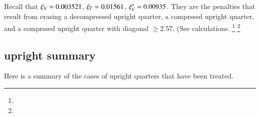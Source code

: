 Recall that $\xi_V=0.003521$, $\xi_\Gamma=0.01561$, $\xi_\Gamma'=0.00935$. They are
the penalties that result from erasing a 
decompressed upright quarter, a comprssed upright quarter, 
and a comprssed upright quarter
with diagonal $\ge2.57$. (See calculations.%
\footnote{} %
\footnote{} %


\subsection{upright summary} %
    \label{sec:upright-summary}

Here is a summary of the cases of upright quarters that have
been treated.
%
